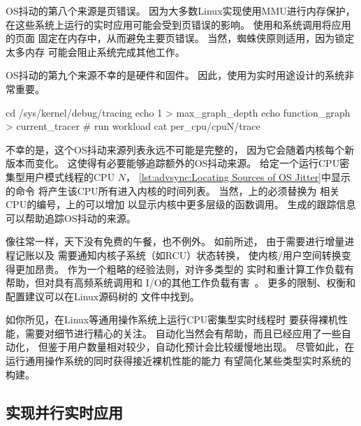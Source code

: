 OS抖动的第八个来源是页错误。
因为大多数Linux实现使用MMU进行内存保护，
在这些系统上运行的实时应用可能会受到页错误的影响。
使用和系统调用将应用的页面
固定在内存中，从而避免主要页错误。
当然，蜘蛛侠原则适用，因为锁定太多内存
可能会阻止系统完成其他工作。

OS抖动的第九个来源不幸的是硬件和固件。
因此，使用为实时用途设计的系统非常重要。

\begin{listing}
\begin{fcvlabel}
\begin{VerbatimL}[commandchars=\\\[\]]
cd /sys/kernel/debug/tracing
echo 1 > max_graph_depth		\lnlbl[echo1]
echo function_graph > current_tracer
# run workload
cat per_cpu/cpuN/trace			\lnlbl[cat]
\end{VerbatimL}
\end{fcvlabel}
\caption{定位OS抖动来源}
\label{lst:advsync:Locating Sources of OS Jitter}
\end{listing}

\begin{fcvref}
不幸的是，这个OS抖动来源列表永远不可能是完整的，
因为它会随着内核每个新版本而变化。
这使得有必要能够追踪额外的OS抖动来源。
给定一个运行CPU密集型用户模式线程的CPU $N$，
\cref{lst:advsync:Locating Sources of OS Jitter}中显示的命令
将产生该CPU所有进入内核的时间列表。
当然，上的必须替换为
相关CPU的编号，上的可以增加
以显示内核中更多层级的函数调用。
生成的跟踪信息可以帮助追踪OS抖动的来源。
\end{fcvref}

像往常一样，天下没有免费的午餐，也不例外。
如前所述，
由于需要进行增量进程记账以及
需要通知内核子系统（如RCU）状态转换，
使内核/用户空间转换变得更加昂贵。
作为一个粗略的经验法则，对许多类型的
实时和重计算工作负载有帮助，但对具有高频系统调用和
I/O的其他工作负载有害~\cite{AbdullahAljuhni2018nohzfull}。
更多的限制、权衡和配置建议可以在Linux源码树的
文件中找到。

如你所见，在Linux等通用操作系统上运行CPU密集型实时线程时
要获得裸机性能，需要对细节进行精心的关注。
自动化当然会有帮助，而且已经应用了一些自动化，
但鉴于用户数量相对较少，自动化预计会比较缓慢地出现。
尽管如此，在运行通用操作系统的同时获得接近裸机性能的能力
有望简化某些类型实时系统的构建。

\subsection{实现并行实时应用}
\label{sec:advsync:Implementing Parallel Real-Time Applications}

